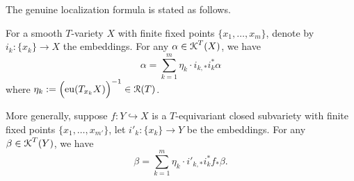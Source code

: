 The genuine localization formula is stated as follows.

\begin{theorem}\label{thm:localization_formula}
For a smooth $T$-variety $X$ with finite fixed points $\{x_1,\ldots,x_m \}$, denote by $i_k: \{x_k\} \longrightarrow X$ the embeddings. For any $\alpha \in \operatorname{\operatorname{\mathcal{K}}}^T(X)$, we have
$$\alpha= \sum_{k=1}^{m} \eta_k \cdot i_{k,*}i_{k}^* \alpha $$
where $\eta_k:= \left(\!\rule{0mm}{3.5mm} \eu(T_{x_k}X) \right)^{-1} \in \Rptc(T)$.

More generally, suppose $f: Y \hookrightarrow X$ is a $T$-equivariant closed subvariety with finite fixed points $\{x_1,\ldots,x_{m'} \}$, let $i'_k: \{x_k\} \longrightarrow Y$ be the embeddings. For any $\beta \in \operatorname{\operatorname{\mathcal{K}}}^T(Y)$, we have
$$\beta= \sum_{k=1}^{m} \eta_k \cdot i'_{k,*}i_{k}^* f_{*} \beta. $$

\end{theorem}


